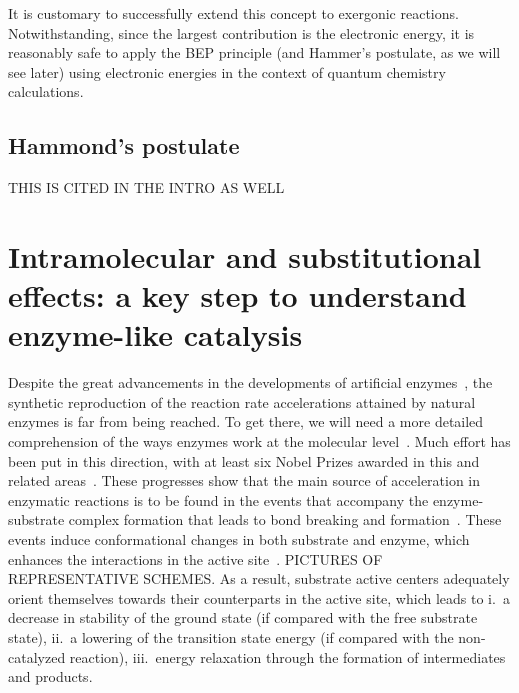 
It is customary to successfully extend this concept to exergonic reactions.
Notwithstanding,
since the largest contribution is the electronic energy,
it is reasonably
safe to apply the BEP principle (and Hammer's postulate,
as we will see later)
using electronic energies in the context of quantum chemistry calculations.

\subsection{Hammond's postulate}

THIS IS CITED IN THE INTRO AS WELL

\section{Intramolecular and substitutional effects:
  a key step to understand enzyme-like catalysis}

Despite the great advancements in the developments of artificial enzymes~\cite{Breslow_1995},
the synthetic reproduction of the reaction rate accelerations attained by
natural enzymes is far from being reached.
To get there,
we will need a more detailed comprehension of the ways enzymes
work at the molecular level~\cite{Catalysis_in_Chemistry_and_Enzymology}.
Much effort has been put in this direction,
with at least six Nobel Prizes
awarded in this and related areas~\cite{Nobel_1929,Nobel_1946,Nobel_1957,Nobel_1975,Nobel_1997,Nobel_2013}.
These progresses show that the main source of acceleration in
enzymatic reactions is to be found in the events that accompany the
enzyme-substrate complex formation that leads to bond breaking and
formation~\cite{Catalysis_in_Chemistry_and_Enzymology}.
These events induce conformational changes in both substrate and enzyme,
which
enhances the interactions in the active site~\cite{Fischer_1890,Fischer_1894,Koshland_1958,Dafforn_1971,Kirby_1996}.
PICTURES OF REPRESENTATIVE SCHEMES.\@
As a result,
substrate active centers adequately orient themselves towards
their counterparts in the active site,
which leads to
i.\ a decrease in stability of the ground state (if compared with the
free substrate state),
ii.\ a lowering of the transition state energy (if compared with the
non-catalyzed reaction),
iii.\ energy relaxation through the formation of intermediates and
products.

